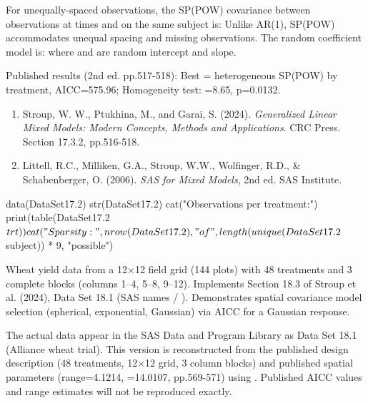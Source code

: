 \documentclass[a4paper]{book}
\begin{document}
%
\begin{Details}
For unequally-spaced observations, the SP(POW) covariance between
observations at times  and  on the same subject is:
Unlike AR(1), SP(POW) accommodates unequal spacing and missing observations.
The random coefficient model is:
where  and  are random intercept and slope.

Published results (2nd ed. pp.517-518):
Best = heterogeneous SP(POW) by treatment, AICC=575.96;
Homogeneity test: =8.65, p=0.0132.
\end{Details}
%
\begin{References}
\begin{enumerate}

\item{} Stroup, W. W., Ptukhina, M., and Garai, S. (2024).
\emph{Generalized Linear Mixed Models: Modern Concepts,
Methods and Applications}. CRC Press. Section 17.3.2, pp.516-518.
\item{} Littell, R.C., Milliken, G.A., Stroup, W.W., Wolfinger, R.D.,
\& Schabenberger, O. (2006). \emph{SAS for Mixed Models}, 2nd ed.
SAS Institute.

\end{enumerate}

\end{References}
%
\begin{SeeAlso}
\end{SeeAlso}
%
\begin{Examples}
\begin{ExampleCode}
data(DataSet17.2)
str(DataSet17.2)
cat("Observations per treatment:\n")
print(table(DataSet17.2$trt))
cat("Sparsity:", nrow(DataSet17.2), "of",
    length(unique(DataSet17.2$subject)) * 9, "possible\n")
\end{ExampleCode}
\end{Examples}
%
\begin{Description}
Wheat yield data from a 12×12 field grid (144 plots) with 48 treatments
and 3 complete blocks (columns 1–4, 5–8, 9–12).  Implements Section 18.3
of Stroup et al. (2024), Data Set 18.1 (SAS names  /
).  Demonstrates spatial covariance model selection
(spherical, exponential, Gaussian) via AICC for a Gaussian response.

 The actual data appear in the SAS Data and
Program Library as Data Set 18.1 (Alliance wheat trial).  This version is
reconstructed from the published design description (48 treatments, 12×12
grid, 3 column blocks) and published spatial parameters (range=4.1214,
=14.0107, pp.569-571) using .
Published AICC values and range estimates will not be reproduced exactly.
\end{Description}
\end{document}
